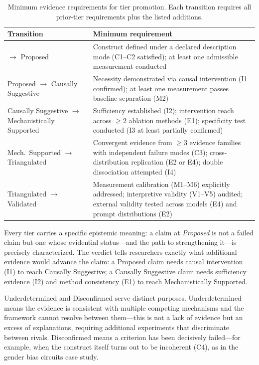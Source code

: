 \documentclass[10pt]{article}
\begin{document}
\begin{table}[H]
\centering
\small
\caption{Minimum evidence requirements for tier promotion. Each transition requires all prior-tier requirements plus the listed additions.}
\label{tab:tier-promotion}
\renewcommand{\arraystretch}{1.15}
\begin{tabular}{@{}l>{\raggedright\arraybackslash}p{10cm}@{}}
\toprule
\textbf{Transition} & \textbf{Minimum requirement} \\
\midrule
$\to$ Proposed & Construct defined under a declared description mode (C1--C2 satisfied); at least one admissible measurement conducted \\
\midrule
Proposed $\to$ Causally Suggestive & Necessity demonstrated via causal intervention (I1 confirmed); at least one measurement passes baseline separation (M2) \\
\midrule
Causally Suggestive $\to$ Mechanistically Supported & Sufficiency established (I2); intervention reach across $\geq 2$ ablation methods (E1); specificity test conducted (I3 at least partially confirmed) \\
\midrule
Mech.\ Supported $\to$ Triangulated & Convergent evidence from $\geq 3$ evidence families with independent failure modes (C3); cross-distribution replication (E2 or E4); double dissociation attempted (I4) \\
\midrule
Triangulated $\to$ Validated & Measurement calibration (M1--M6) explicitly addressed; interpretive validity (V1--V5) audited; external validity tested across models (E4) and prompt distributions (E2) \\
\bottomrule
\end{tabular}
\end{table}

Every tier carries a specific epistemic meaning: a claim at \emph{Proposed} is not a failed claim but one whose evidential status---and the path to strengthening it---is precisely characterized. The verdict tells researchers exactly what additional evidence would advance the claim: a Proposed claim needs causal intervention (I1) to reach Causally Suggestive; a Causally Suggestive claim needs sufficiency evidence (I2) and method consistency (E1) to reach Mechanistically Supported.

Underdetermined and Disconfirmed serve distinct purposes. Underdetermined means the evidence is consistent with multiple competing mechanisms and the framework cannot resolve between them---this is not a lack of evidence but an excess of explanations, requiring additional experiments that discriminate between rivals. Disconfirmed means a criterion has been decisively failed---for example, when the construct itself turns out to be incoherent (C4), as in the gender bias circuits case study.
\end{document}
